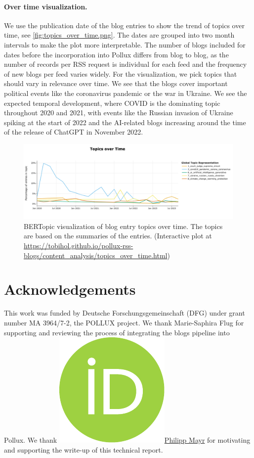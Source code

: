 \documentclass{article}
\begin{document}
\paragraph{Over time visualization.}
We use the publication date of the blog entries to show the trend of topics over time, see \autoref{fig:topics_over_time.png}. The dates are grouped into two month intervals to make the plot more interpretable. The number of blogs included for dates before the incorporation into Pollux differs from blog to blog, as the number of records per RSS request is individual for each feed and the frequency of new blogs per feed varies widely. For the visualization, we pick topics that should vary in relevance over time. We see that the blogs cover important political events like the coronavirus pandemic or the war in Ukraine. We see the expected temporal development, where COVID is the dominating topic throughout 2020 and 2021, with events like the Russian invasion of Ukraine spiking at the start of 2022 and the AI-related blogs increasing around the time of the release of ChatGPT in November 2022.

\begin{figure}[!htb]
    \includegraphics[width=1.0\textwidth]{figures/topics_over_time.png}
    \caption{BERTopic visualization of blog entry topics over time. The topics are based on the summaries of the entries. (Interactive plot at \url{https://tobihol.github.io/pollux-rss-blogs/content_analysis/topics_over_time.html})}
    \label{fig:topics_over_time.png}
\end{figure}

\section*{Acknowledgements}
This work was funded by Deutsche Forschungsgemeinschaft (DFG) under grant number MA 3964/7-2, the POLLUX project.
We thank Marie-Saphira Flug for supporting and reviewing the process of integrating the blogs pipeline into Pollux.
We thank \href{https://orcid.org/0000-0002-6656-1658}{\includegraphics[scale=0.06]{orcid.pdf}Philipp Mayr} for motivating and supporting the write-up of this technical report.
\printbibliography
\end{document}
